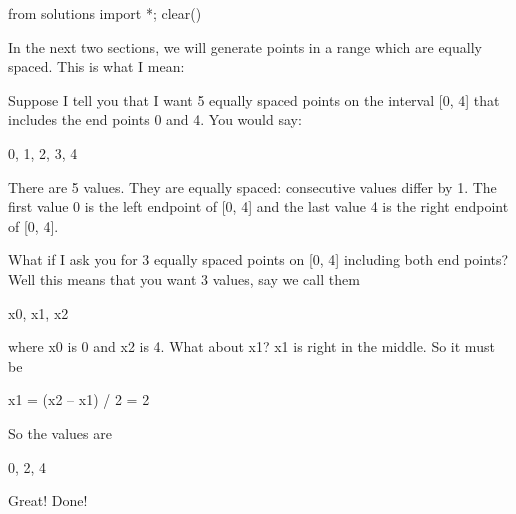 \begin{python0}
from solutions import *; clear()
\end{python0}

In the next two sections, we will generate points in a range which are
equally spaced. This is what I mean:

Suppose I tell you that I want 5 equally spaced points on the interval [0, 4] that includes the end points 0 and 4. You would say:
\begin{center}
0, 1, 2, 3, 4
\end{center}
There are 5 values. They are equally spaced: consecutive values differ
by 1. The first value 0 is the left endpoint of [0, 4] and the last
value 4 is the right endpoint of [0, 4].

What if I ask you for 3 equally spaced points on [0, 4] including
both end points? Well this means that you want 3 values, say we call
them
\begin{center}
x0, x1, x2
\end{center}
where x0 is 0 and x2 is 4. What about x1? x1 is right in the middle. So
it must be
\begin{center}
x1 = (x2 -- x1) / 2 = 2
\end{center}
So the values are
\begin{center}
0, 2, 4
\end{center}
Great! Done!

